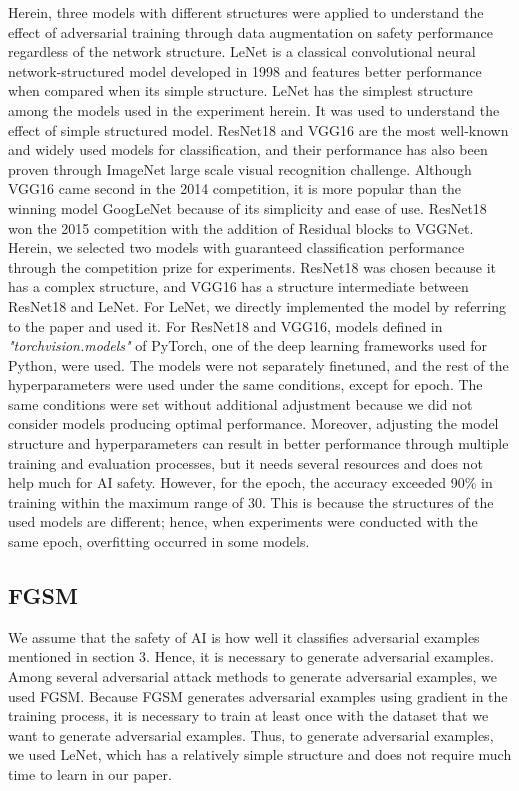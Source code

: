 \documentclass[journal,article,submit,moreauthors,pdftex]{Definitions/mdpi}
\begin{document}
Herein, three models with different structures were applied to understand the effect of adversarial training through data augmentation on safety performance regardless of the network structure.
LeNet\cite{lenet} is a classical convolutional neural network-structured model developed in 1998 and features better performance when compared when its simple structure.
LeNet has the simplest structure among the models used in the experiment herein. It was used to understand the effect of simple structured model.
ResNet18\cite{resnet} and VGG16\cite{vgg} are the most well-known and widely used models for classification, and their performance has also been proven through ImageNet large scale visual recognition challenge.
Although VGG16 came second in the 2014 competition, it is more popular than the winning model GoogLeNet because of its simplicity and ease of use.
ResNet18 won the 2015 competition with the addition of Residual blocks to VGGNet.
Herein, we selected two models with guaranteed classification performance through the competition prize for experiments.
ResNet18 was chosen because it has a complex structure, and VGG16 has a structure intermediate between ResNet18 and LeNet.
For LeNet, we directly implemented the model by referring to the paper and used it.
For ResNet18 and VGG16, models defined in {\it "torchvision.models"} of PyTorch\cite{pytorch}, one of the deep learning frameworks used for Python, were used.
The models were not separately finetuned, and the rest of the hyperparameters were used under the same conditions, except for epoch.
The same conditions were set without additional adjustment because we did not consider models producing optimal performance.
Moreover, adjusting the model structure and hyperparameters can result in better performance through multiple training and evaluation processes, but it needs several resources and does not help much for AI safety.
However, for the epoch, the accuracy exceeded 90\% in training within the maximum range of 30. This is because the structures of the used models are different; hence, when experiments were conducted with the same epoch, overfitting occurred in some models.

\subsection{FGSM}

We assume that the safety of AI is how well it classifies adversarial examples mentioned in section 3.
Hence, it is necessary to generate adversarial examples. Among several adversarial attack methods to generate adversarial examples, we used FGSM\cite{adversarial-goodfellow}.
Because FGSM generates adversarial examples using gradient in the training process, it is necessary to train at least once with the dataset that we want to generate adversarial examples.
Thus, to generate adversarial examples, we used LeNet, which has a relatively simple structure and does not require much time to learn in our paper.
\end{document}
